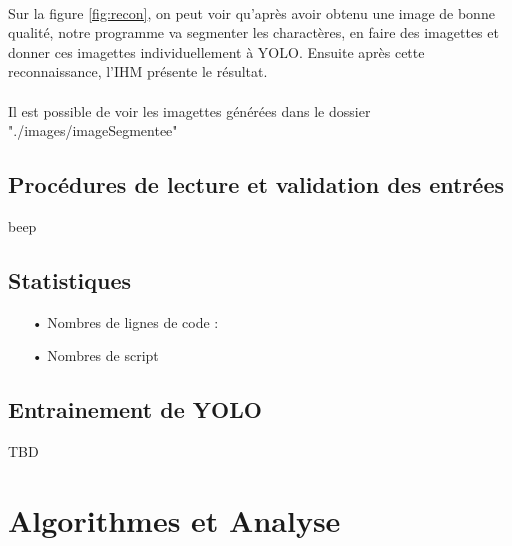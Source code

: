 \documentclass[a4paper]{article}
\begin{document}
			\paragraph{}Sur la figure \ref{fig:recon}, on peut voir qu'après avoir obtenu une image de bonne qualité, notre programme va segmenter les charactères, en faire des imagettes et donner ces imagettes individuellement à YOLO. Ensuite après cette reconnaissance, l'IHM présente le résultat.
			\paragraph{}Il est possible de voir les imagettes générées dans le dossier "./images/imageSegmentee"
		\subsection{Procédures de lecture et validation des entrées}
			beep	
		\subsection{Statistiques}
			\begin{itemize}
				\item[•] Nombres de lignes de code : 
				\item[•] Nombres de script
			\end{itemize}
		\subsection{Entrainement de YOLO}
			TBD
	\section{Algorithmes et Analyse}
\end{document}
